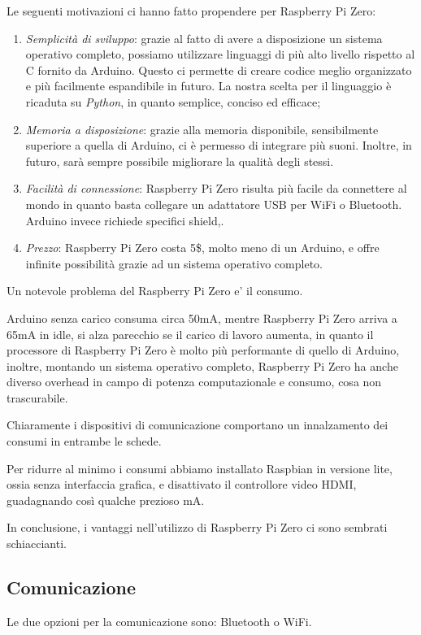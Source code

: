 \documentclass[12pt]{article}
\newcommand{\raspi}{Raspberry Pi}
\newcommand{\raszero} {\raspi{} Zero}
\begin{document}
Le seguenti motivazioni ci hanno fatto propendere per \raszero :
\begin{enumerate}
\item \emph{Semplicità di sviluppo}: grazie al fatto di avere a disposizione un sistema operativo completo, possiamo utilizzare linguaggi di più alto livello rispetto al C fornito da Arduino. Questo ci permette di creare codice meglio organizzato e più facilmente espandibile in futuro. La nostra scelta per il linguaggio è ricaduta su \emph{Python}, in quanto semplice, conciso ed efficace;
\item \emph{Memoria a disposizione}: grazie alla memoria disponibile, sensibilmente superiore a quella di Arduino, ci è permesso di integrare più suoni. Inoltre, in futuro, sarà sempre possibile migliorare la qualità degli stessi.
\item \emph{Facilità di connessione}: \raszero{} risulta più facile da connettere al mondo in quanto basta collegare un adattatore USB per WiFi o Bluetooth. Arduino invece richiede specifici shield,.
\item \emph{Prezzo}: \raszero{} costa 5\$, molto meno di un Arduino, e offre infinite possibilità grazie ad un sistema operativo completo.
\end{enumerate}

Un notevole problema del \raszero{} e' il consumo.

Arduino senza carico consuma circa 50mA, mentre \raszero{} arriva a 65mA in idle, si alza parecchio se il carico di lavoro aumenta, in quanto il processore di \raszero{} è molto più performante di quello di Arduino, inoltre, montando un sistema operativo completo, \raszero{} ha anche diverso overhead in campo di potenza computazionale e consumo, cosa non trascurabile.

Chiaramente i dispositivi di comunicazione comportano un innalzamento dei consumi in entrambe le schede.

Per ridurre al minimo i consumi abbiamo installato Raspbian in versione lite, ossia senza interfaccia grafica, e disattivato il controllore video HDMI, guadagnando così qualche prezioso mA.

In conclusione, i vantaggi nell'utilizzo di \raszero{} ci sono sembrati schiaccianti.

\subsection{Comunicazione}
Le due opzioni per la comunicazione sono: Bluetooth o WiFi.
\end{document}
